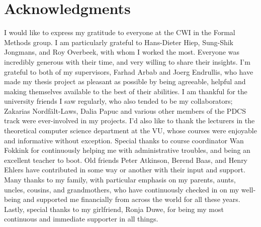 \documentclass[11pt]{report}
\begin{document}

\chapter*{Acknowledgments}
I would like to express my gratitude to everyone at the CWI in the Formal Methods group. I am particularly grateful to Hans-Dieter Hiep, Sung-Shik Jongmans, and Roy Overbeek, with whom I worked the most. Everyone was incredibly generous with their time, and very willing to share their insights. I'm grateful to both of my supervisors, Farhad Arbab and Joerg Endrullis, who have made my thesis project as pleasant as possible by being agreeable, helpful and making themselves available to the best of their abilities. I am thankful for the university friends I saw regularly, who also tended to be my collaborators; Zakarias Nordf\"alt-Laws, Dalia Papuc and various other members of the PDCS track were ever-involved in my projects. I'd also like to thank the lecturers in the theoretical computer science department at the VU, whose courses were enjoyable and informative without exception. Special thanks to course coordinator Wan Fokkink for continuously helping me with administrative troubles, and being an excellent teacher to boot. Old friends Peter Atkinson, Berend Baas, and Henry Ehlers have contributed in some way or another with their input and support. Many thanks to my family, with particular emphasis on my parents, aunts, uncles, cousins, and grandmothers, who have continuously checked in on my well-being and supported me financially from across the world for all these years. Lastly, special thanks to my girlfriend, Ronja Duwe, for being my most continuous and immediate supporter in all things.


\end{document}
